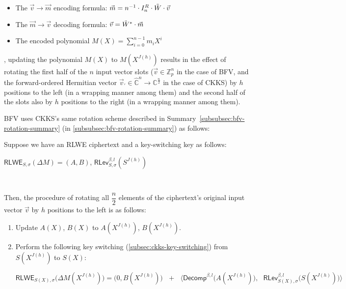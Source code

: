 \begin{itemize}
    \item The $\vec{v} \rightarrow \vec{m}$ encoding formula: $\vec{m} = n^{-1}\cdot I_n^R\cdot \tilde{W}\cdot \vec{v}$
    \item The $\vec{m} \rightarrow \vec{v}$ decoding formula: $\vec{v} = \tilde{W}^* \cdot \vec{m}$
    \item The encoded polynomial $M(X) = \sum\limits_{i=0}^{n-1}m_iX^i$
\end{itemize}    

, updating the polynomial $M(X)$ to $M(X^{J(h)})$ results in the effect of rotating the first half of the $n$ input vector slots ($\vec{v} \in \mathbb{Z}^n_p$ in the case of BFV, and the forward-ordered Hermitian vector $\vec{v}_{'} \in \mathbb{\hat C}^{n} \rightarrow \mathbb{C}^{\frac{n}{2}}$ in the case of CKKS) by $h$ positions to the left (in a wrapping manner among them) and the second half of the slots also by $h$ positions to the right (in a wrapping manner among them). 

BFV uses CKKS's same rotation scheme described in Summary~\ref*{subsubsec:bfv-rotation-summary} (in \autoref{subsubsec:bfv-rotation-summary}) as follows: 


\begin{tcolorbox}[title={\textbf{\tboxlabel{\ref*{subsec:ckks-rotation}} CKKS's Homomorphic Rotation of Input Vector Slots}}]



Suppose we have an RLWE ciphertext and a key-switching key as follows:

$\textsf{RLWE}_{S, \sigma}(\Delta M) = (A, B)$, \text{ } $\textsf{RLev}_{S, \sigma}^{\beta, l}(S^{J(h)})$

$ $

Then, the procedure of rotating all $\dfrac{n}{2}$ elements of the ciphertext's original input vector $\vec{v}$ by $h$ positions to the left is as follows: 

\begin{enumerate}
\item Update $A(X)$, $B(X)$ to $A(X^{J(h)})$, $B(X^{J(h)})$. 
\item Perform the following key switching (\autoref{subsec:ckks-key-switching}) from $S(X^{J(h)})$ to $S(X)$:


$\textsf{RLWE}_{S(X),\sigma}\bm{(}\Delta M(X^{J(h)})\bm{)} = \bm{(} 0, B(X^{J(h)}) \bm{)} \text{ } + \text{ } \bm{\langle}  \textsf{Decomp}^{\beta, l}\bm{(}A(X^{J(h)})\bm{)}, \text{ } \textsf{RLev}_{S(X), \sigma}^{\beta, l}\bm{(}S(X^{J(h)})\bm{)} \bm{\rangle}$
\end{enumerate}

\end{tcolorbox}

